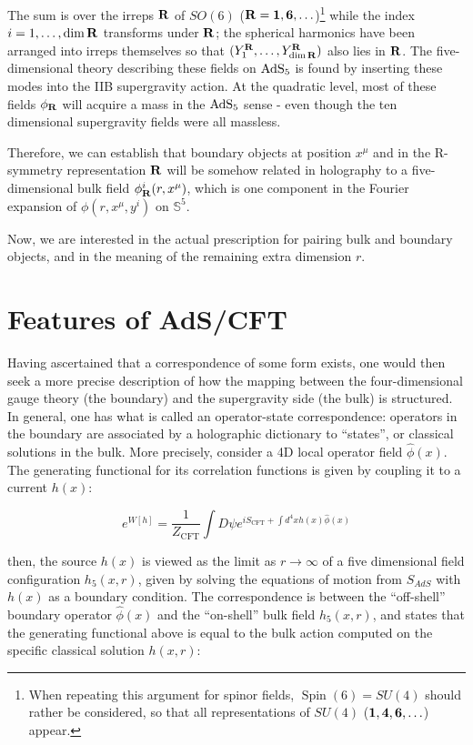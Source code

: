 The sum is over the irreps $\mathbf{R}$ of $SO(6)$ ($\mathbf{R} = \mathbf{1}, \mathbf{6}, \ldots$)\footnote{When repeating this argument for spinor fields, $\operatorname{Spin}(6) = SU(4)$ should rather be considered, so that all representations of $SU(4)$ ($\mathbf{1}, \mathbf{4},\mathbf{6}, \ldots$) appear.} while the index $i = 1,\ldots,\dim \mathbf{R}$ transforms under $\mathbf{R}$; the spherical harmonics have been arranged into irreps themselves so that $(Y^{\mathbf{R}}_1, \ldots, Y^{\mathbf{R}}_{\dim \mathbf{R}} ) $ also lies in $\mathbf{R}$. The five-dimensional theory describing these fields on $\operatorname{AdS}_{5}$ is found by inserting these modes into the IIB supergravity action. At the quadratic level, most of these fields $\phi_{\mathbf{R}}$ will acquire a mass in the $\operatorname{AdS}_{5}$ sense - even though the ten dimensional supergravity fields were all massless.

Therefore, we can establish that boundary objects at position $x^\mu$ and in the R-symmetry representation $\mathbf{R}$ will be somehow related in holography to a five-dimensional bulk field $\phi^i_{\mathbf{R}} (r,x^\mu)$, which is one component in the Fourier expansion of $\phi(r,x^\mu,y^i)$ on $\mathbb{S}^5$.

Now, we are interested in the actual prescription for pairing bulk and boundary objects, and in the meaning of the remaining extra dimension $r$.

\section{Features of AdS/CFT}

Having ascertained that a correspondence of some form exists, one would then seek a more precise description of how the mapping between the four-dimensional gauge theory (the boundary) and the supergravity side (the bulk) is structured. In general, one has what is called an operator-state correspondence: operators in the boundary are associated by a holographic dictionary to ``states'', or classical solutions in the bulk. More precisely, consider a 4D local operator field $\hat \phi(x)$. The generating functional for its correlation functions is given by coupling it to a current $h(x)$:

\begin{equation}
	e^{W[h]} = \frac{1}{Z_\text{CFT}}\int D\psi e^{i S_\text{CFT} + \int d^4 x h(x) \hat \phi(x)}
\end{equation}

then, the source $h(x)$ is viewed as the limit as $r \rightarrow \infty$ of a five dimensional field configuration $h_5(x,r)$, given by solving the equations of motion from $S_{AdS}$ with $h(x)$ as a boundary condition. The correspondence is between the ``off-shell'' boundary operator $\hat \phi(x)$ and the ``on-shell'' bulk field $h_5(x,r)$, and states that the generating functional above is equal to the bulk action computed on the specific classical solution $h(x,r)$:

